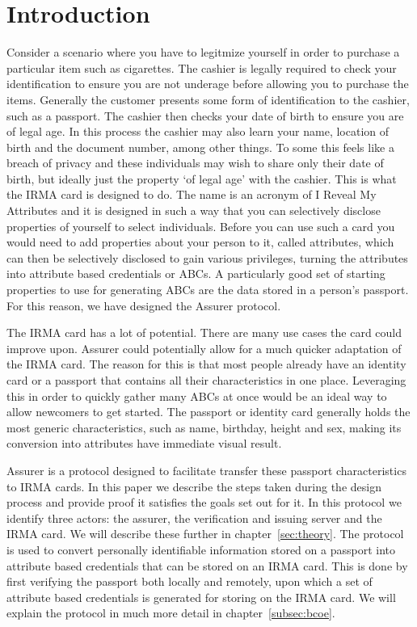 \chapter{Introduction}
Consider a scenario where you have to legitmize yourself in order to purchase a particular item such as cigarettes. The cashier is legally required to check your identification to ensure you are not underage before allowing you to purchase the items. Generally the customer presents some form of identification to the cashier, such as a passport. The cashier then checks your date of birth to ensure you are of legal age. In this process the cashier may also learn your name, location of birth and the document number, among other things. To some this feels like a breach of privacy and these individuals may wish to share only their date of birth, but ideally just the property `of legal age' with the cashier. This is what the IRMA card is designed to do. The name is an acronym of I Reveal My Attributes and it is designed in such a way that you can selectively disclose properties of yourself to select individuals. Before you can use such a card you would need to add properties about your person to it, called attributes, which can then be selectively disclosed to gain various privileges, turning the attributes into attribute based credentials or ABCs. A particularly good set of starting properties to use for generating ABCs are the data stored in a person's passport. For this reason, we have designed the Assurer protocol.

The IRMA card has a lot of potential. There are many use cases the card could improve upon. Assurer could potentially allow for a much quicker adaptation of the IRMA card. The reason for this is that most people already have an identity card or a passport that contains all their characteristics in one place. Leveraging this in order to quickly gather many ABCs at once would be an ideal way to allow newcomers to get started. The passport or identity card generally holds the most generic characteristics, such as name, birthday, height and sex, making its conversion into attributes have immediate visual result.

Assurer is a protocol designed to facilitate transfer these passport characteristics to IRMA cards. In this paper we describe the steps taken during the design process and provide proof it satisfies the goals set out for it. In this protocol we identify three actors: the assurer, the verification and issuing server and the IRMA card. We will describe these further in chapter~\ref{sec:theory}. The protocol is used to convert personally identifiable information stored on a passport into attribute based credentials that can be stored on an IRMA card. This is done by first verifying the passport both locally and remotely, upon which a set of attribute based credentials is generated for storing on the IRMA card. We will explain the protocol in much more detail in chapter~\ref{subsec:bcoe}.

